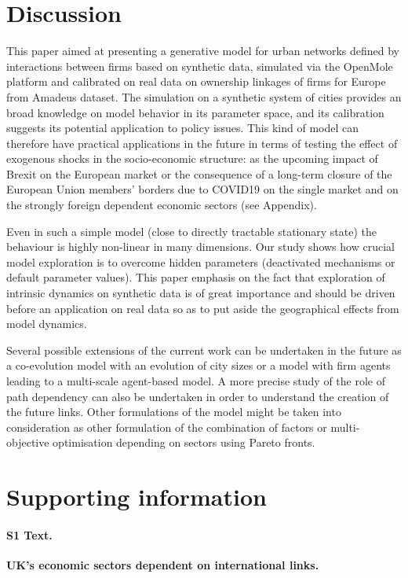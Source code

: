 \documentclass[10pt,letterpaper]{article}
\begin{document}
\section*{Discussion}

This paper aimed at presenting a generative model for urban networks defined by interactions between firms based on synthetic data, simulated via the OpenMole platform and calibrated on real data on ownership linkages of firms for Europe from Amadeus dataset. The simulation on a synthetic system of cities provides an broad knowledge on model behavior in its parameter space, and its calibration suggests its potential application to policy issues. This kind of model can therefore have practical applications in the future in terms of testing the effect of exogenous shocks in the socio-economic structure: as the upcoming impact of Brexit on the European market or the consequence of a long-term closure of the European Union members' borders due to COVID19 on the single market and on the strongly foreign dependent economic sectors (see Appendix).

Even in such a simple model (close to directly tractable stationary state) the behaviour is highly non-linear in many dimensions. Our study shows how crucial model exploration is to overcome hidden parameters (deactivated mechanisms or default parameter values). This paper emphasis on the fact that exploration of intrinsic dynamics on synthetic data is of great importance and should be driven before an application on real data so as to put aside the geographical effects from model dynamics.

Several possible extensions of the current work can be undertaken in the future as a co-evolution model with an evolution of city sizes or a model with firm agents leading to a multi-scale agent-based model. A more precise study of the role of path dependency can also be undertaken in order to understand the creation of the future links. Other formulations of the model might be taken into consideration as other formulation of the combination of factors or multi-objective optimisation depending on sectors using Pareto fronts.  






\section*{Supporting information}

\paragraph*{S1 Text.}
\label{S1_Text}
{\bf UK's economic sectors dependent on international links.}
\end{document}
